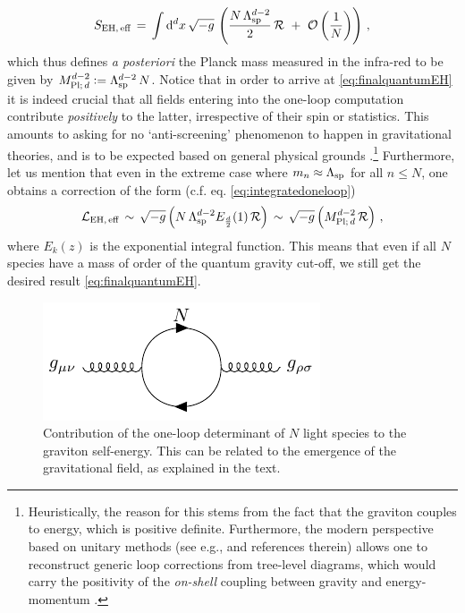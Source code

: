 %
\begin{equation}\label{eq:finalquantumEH}
	S_{\text{EH},\, \text{eff}}\, =\, \int \dd^{d}x\, \sqrt{-g}\,  \left(\frac{N\, \LSP^{d-2}}{2}\, \mathcal{R}\ +\ \mathcal{O}\left(\frac{1}{N} \right)\right)\, ,
\end{equation}
%
which thus defines \emph{a posteriori} the Planck mass measured in the infra-red to be given by $M_{\text{Pl;}\, d}^{d-2} := \Lambda_{\text{sp}}^{d-2}\, N$. Notice that in order to arrive at \eqref{eq:finalquantumEH} it is indeed crucial that all fields entering into the one-loop computation contribute \emph{positively} to the latter, irrespective of their spin or statistics. This amounts to asking for no `anti-screening' phenomenon to happen in gravitational theories, and is to be expected based on general physical grounds \cite{Anber:2011ut,Donoghue:1994dn, Han:2004wt}.\footnote{Heuristically, the reason for this stems from the fact that the graviton couples to energy, which is positive definite. Furthermore, the modern perspective based on unitary methods (see e.g., \cite{Elvang:2013cua,Kruczenski:2022lot} and references therein) allows one to reconstruct generic loop corrections from tree-level diagrams, which would carry the positivity of the \emph{on-shell} coupling between gravity and energy-momentum \cite{Donoghueprivate}.} Furthermore, let us mention that even in the extreme case where $m_n \approx \Lambda_{\text{sp}}$ for all $n \leq N$, one obtains a correction of the form (c.f. eq. \eqref{eq:integratedoneloop})
%
\begin{equation}\label{eq:extremequantumEH}
	\mathcal{L}_{\text{EH},\, \text{eff}}\, \sim\, \sqrt{-g} \left( N\, \Lambda_{\text{sp}}^{d-2} E_{\frac{d}{2}} (1)\, \mathcal{R} \right)\, \sim\, \sqrt{-g} \left(M_{\text{Pl;}\, d}^{d-2}\, \mathcal{R} \right)\, ,
\end{equation}
%
where $E_{k}(z)$ is the exponential integral function. This means that even if all $N$ species have a mass of order of the quantum gravity cut-off, we still get the desired result \eqref{eq:finalquantumEH}.

\begin{figure}[tb]
		\begin{center}
			\includegraphics[scale=1.3]{Graviton_Loop.pdf}
			\caption{Contribution of the one-loop determinant of $N$ light species to the graviton self-energy. This can be related to the emergence of the gravitational field, as explained in the text.}
			\label{fig:oneloopgraviton}
		\end{center}
\end{figure}

